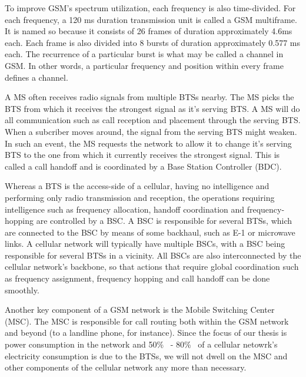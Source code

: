 To improve GSM's spectrum utilization, each frequency is also time-divided. For each frequency, a 120 ms duration transmission unit is called a GSM multiframe. It is named so because it consists of 26 frames of duration approximately 4.6ms each. Each frame is also divided into 8 bursts of duration approximately 0.577 ms each. The recurrence of a particular burst is what may be called a channel in GSM. In other words, a particular frequency and position within every frame defines a channel.

A MS often receives radio signals from multiple BTSs nearby. The MS picks the BTS from which it receives the strongest signal as it's serving BTS. A MS will do all communication such as call reception and placement through the serving BTS. When a subcriber moves around, the signal from the serving BTS might weaken. In such an event, the MS requests the network to allow it to change it's serving BTS to the one from which it currently receives the strongest signal. This is called a call handoff and is coordinated by a Base Station Controller (BDC).

Whereas a BTS is the access-side of a cellular, having no intelligence and performing only radio transmission and reception, the operations requiring intelligence such as frequency allocation, handoff coordination and frequency-hopping are controlled by a BSC. A BSC is responsible for several BTSs, which are connected to the BSC by means of some backhaul, such as E-1 or microwave links. A cellular network will typically have multiple BSCs, with a BSC being responsible for several BTSs in a vicinity. All BSCs are also interconnected by the cellular network's backbone, so that actions that require global coordination such as frequency assignment, frequency hopping and call handoff can be done smoothly.

Another key component of a GSM network is the Mobile Switching Center (MSC). The MSC is responsible for call routing both within the GSM network and beyond (to a landline phone, for instance). Since the focus of our thesis is power consumption in the network and 50\%~\cite{Louhi:2007:BTSPower:INTELEC} - 80\%~\cite{Oh:Comm:2011} of a cellular netowrk's electricity consumption is due to the BTSs, we will not dwell on the MSC and other components of the cellular network any more than necessary.

